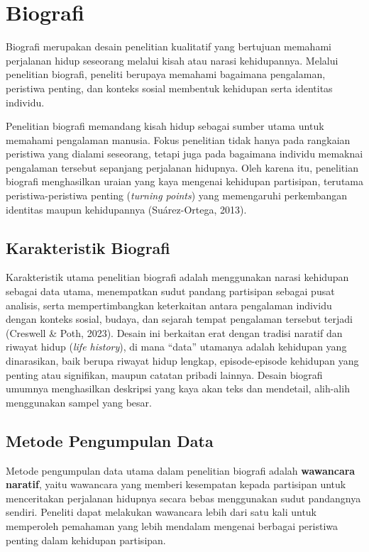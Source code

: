 \documentclass[
  indonesian,
  letterpaper,
  DIV=11,
  numbers=noendperiod]{scrreprt}
\begin{document}
\section{Biografi}\label{biografi}

Biografi merupakan desain penelitian kualitatif yang bertujuan memahami
perjalanan hidup seseorang melalui kisah atau narasi kehidupannya.
Melalui penelitian biografi, peneliti berupaya memahami bagaimana
pengalaman, peristiwa penting, dan konteks sosial membentuk kehidupan
serta identitas individu.

Penelitian biografi memandang kisah hidup sebagai sumber utama untuk
memahami pengalaman manusia. Fokus penelitian tidak hanya pada rangkaian
peristiwa yang dialami seseorang, tetapi juga pada bagaimana individu
memaknai pengalaman tersebut sepanjang perjalanan hidupnya. Oleh karena
itu, penelitian biografi menghasilkan uraian yang kaya mengenai
kehidupan partisipan, terutama peristiwa-peristiwa penting
(\emph{turning points}) yang memengaruhi perkembangan identitas maupun
kehidupannya (Suárez-Ortega, 2013).

\subsection{Karakteristik Biografi}\label{karakteristik-biografi}

Karakteristik utama penelitian biografi adalah menggunakan narasi
kehidupan sebagai data utama, menempatkan sudut pandang partisipan
sebagai pusat analisis, serta mempertimbangkan keterkaitan antara
pengalaman individu dengan konteks sosial, budaya, dan sejarah tempat
pengalaman tersebut terjadi (Creswell \& Poth, 2023). Desain ini
berkaitan erat dengan tradisi naratif dan riwayat hidup (\emph{life
history}), di mana ``data'' utamanya adalah kehidupan yang dinarasikan,
baik berupa riwayat hidup lengkap, episode-episode kehidupan yang
penting atau signifikan, maupun catatan pribadi lainnya. Desain biografi
umumnya menghasilkan deskripsi yang kaya akan teks dan mendetail,
alih-alih menggunakan sampel yang besar.

\subsection{Metode Pengumpulan Data}\label{metode-pengumpulan-data-3}

Metode pengumpulan data utama dalam penelitian biografi adalah
\textbf{wawancara naratif}, yaitu wawancara yang memberi kesempatan
kepada partisipan untuk menceritakan perjalanan hidupnya secara bebas
menggunakan sudut pandangnya sendiri. Peneliti dapat melakukan wawancara
lebih dari satu kali untuk memperoleh pemahaman yang lebih mendalam
mengenai berbagai peristiwa penting dalam kehidupan partisipan.
\end{document}
